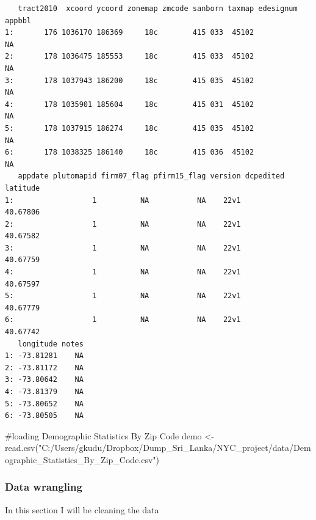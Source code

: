 \documentclass[
  letterpaper,
  DIV=11,
  numbers=noendperiod]{scrartcl}
\newenvironment{Shaded}{\begin{snugshade}}{\end{snugshade}}
\newcommand{\CommentTok}[1]{\textcolor[rgb]{0.37,0.37,0.37}{#1}}
\newcommand{\FunctionTok}[1]{\textcolor[rgb]{0.28,0.35,0.67}{#1}}
\newcommand{\NormalTok}[1]{\textcolor[rgb]{0.00,0.23,0.31}{#1}}
\newcommand{\OtherTok}[1]{\textcolor[rgb]{0.00,0.23,0.31}{#1}}
\newcommand{\StringTok}[1]{\textcolor[rgb]{0.13,0.47,0.30}{#1}}
\begin{document}
\begin{verbatim}
   tract2010  xcoord ycoord zonemap zmcode sanborn taxmap edesignum appbbl
1:       176 1036170 186369     18c        415 033  45102               NA
2:       178 1036475 185553     18c        415 033  45102               NA
3:       178 1037943 186200     18c        415 035  45102               NA
4:       178 1035901 185604     18c        415 031  45102               NA
5:       178 1037915 186274     18c        415 035  45102               NA
6:       178 1038325 186140     18c        415 036  45102               NA
   appdate plutomapid firm07_flag pfirm15_flag version dcpedited latitude
1:                  1          NA           NA    22v1           40.67806
2:                  1          NA           NA    22v1           40.67582
3:                  1          NA           NA    22v1           40.67759
4:                  1          NA           NA    22v1           40.67597
5:                  1          NA           NA    22v1           40.67779
6:                  1          NA           NA    22v1           40.67742
   longitude notes
1: -73.81281    NA
2: -73.81172    NA
3: -73.80642    NA
4: -73.81379    NA
5: -73.80652    NA
6: -73.80505    NA
\end{verbatim}

\begin{Shaded}
\begin{Highlighting}[]
\CommentTok{\#loading Demographic Statistics By Zip Code}
\NormalTok{demo }\OtherTok{\textless{}{-}} \FunctionTok{read.csv}\NormalTok{(}\StringTok{"C:/Users/gkudu/Dropbox/Dump\_Sri\_Lanka/NYC\_project/data/Demographic\_Statistics\_By\_Zip\_Code.csv"}\NormalTok{)}
\end{Highlighting}
\end{Shaded}

\hypertarget{data-wrangling}{%
\subsubsection{Data wrangling}\label{data-wrangling}}

In this section I will be cleaning the data
\end{document}
